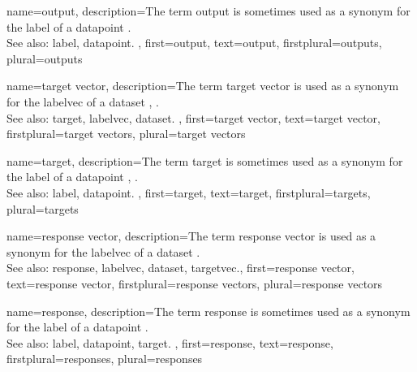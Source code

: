 {name={output},
	description={The term output is sometimes used 
 		as a synonym for the \gls{label} of a \gls{datapoint} \cite{Murphy2012}.
		\\
		See also: \gls{label}, \gls{datapoint}. },  
 	first={output}, 
 	text={output}, 
 	firstplural={outputs}, 
 	plural={outputs}
}

{name={target vector},
	description={The term \gls{target} \gls{vector} is used 
 		as a synonym for the \gls{labelvec} of a \gls{dataset} \cite{Goodfellow-et-al-2016}, \cite{BishopBook}.
		\\
		See also: \gls{target}, \gls{labelvec}, \gls{dataset}. },  
 	first={target vector}, 
 	text={target vector}, 
 	firstplural={target vectors}, 
 	plural={target vectors}
}

{name={target},
	description={The term target is sometimes used 
 		as a synonym for the \gls{label} of a \gls{datapoint} \cite{Goodfellow-et-al-2016}, \cite{BishopBook}.
		\\
		See also: \gls{label}, \gls{datapoint}. },  
 	first={target}, 
 	text={target}, 
 	firstplural={targets}, 
 	plural={targets}
}

{name={response vector},
	description={The term \gls{response} \gls{vector} is used 
 		as a synonym for the \gls{labelvec} of a \gls{dataset} \cite{hastie01statisticallearning}.
		\\
		See also: \gls{response}, \gls{labelvec}, \gls{dataset}, \gls{targetvec}.},  
 	first={response vector}, 
 	text={response vector}, 
 	firstplural={response vectors}, 
 	plural={response vectors}
}

{name={response},
	description={The term response is sometimes used 
 		as a synonym for the \gls{label} of a \gls{datapoint} \cite{hastie01statisticallearning}.
		\\
		See also: \gls{label}, \gls{datapoint}, \gls{target}. },  
 	first={response}, 
 	text={response}, 
 	firstplural={responses}, 
 	plural={responses}
}

